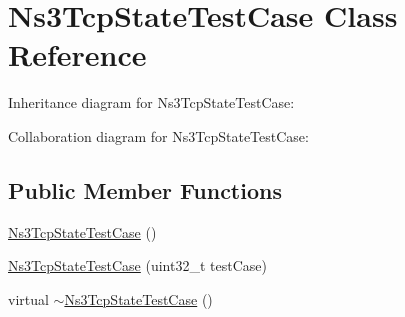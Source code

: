 \hypertarget{classNs3TcpStateTestCase}{}\section{Ns3\+Tcp\+State\+Test\+Case Class Reference}
\label{classNs3TcpStateTestCase}


Inheritance diagram for Ns3\+Tcp\+State\+Test\+Case\+:


Collaboration diagram for Ns3\+Tcp\+State\+Test\+Case\+:
\subsection*{Public Member Functions}
\begin{DoxyCompactItemize}
\item 
\hyperlink{classNs3TcpStateTestCase_a53bef084935ac68e6ad79bbfcfd23b43}{Ns3\+Tcp\+State\+Test\+Case} ()
\item 
\hyperlink{classNs3TcpStateTestCase_a42b399bcfe622283ce02556f7a69f786}{Ns3\+Tcp\+State\+Test\+Case} (uint32\+\_\+t test\+Case)
\item 
virtual \hyperlink{classNs3TcpStateTestCase_a8a16a1d79df85cb99dbcd157aeb62245}{$\sim$\+Ns3\+Tcp\+State\+Test\+Case} ()
\end{DoxyCompactItemize}
